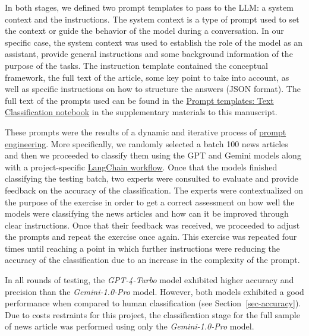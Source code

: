 \documentclass[
]{agujournal2019}
\begin{document}
In both stages, we defined two prompt templates to pass to the LLM: a
system context and the instructions. The system context is a type of
prompt used to set the context or guide the behavior of the model during
a conversation. In our specific case, the system context was used to
establish the role of the model as an assistant, provide general
instructions and some background information of the purpose of the
tasks. The instruction template contained the conceptual framework, the
full text of the article, some key point to take into account, as well
as specific instructions on how to structure the answers (JSON format).
The full text of the prompts used can be found in the
\href{https://ctoruno.github.io/eu-rol-tracker/notebooks/prompts_classification-preview.html}{Prompt
templates: Text Classification notebook} in the supplementary materials
to this manuscript.

These prompts were the results of a dynamic and iterative process of
\href{https://platform.openai.com/docs/guides/prompt-engineering/strategy-write-clear-instructions}{prompt
engineering}. More specifically, we randomly selected a batch 100 news
articles and then we proceeded to classify them using the GPT and Gemini
models along with a project-specific
\href{https://www.langchain.com/}{LangChain workflow}.
Once that the models finished classifying the testing batch, two experts
were consulted to evaluate and provide feedback on the accuracy of the
classification. The experts were contextualized on the purpose of the
exercise in order to get a correct assessment on how well the models
were classifying the news articles and how can it be improved through
clear instructions. Once that their feedback was received, we proceeded
to adjust the prompts and repeat the exercise once again. This exercise
was repeated four times until reaching a point in which further
instructions were reducing the accuracy of the classification due to an
increase in the complexity of the prompt.

In all rounds of testing, the \emph{GPT-4-Turbo} model exhibited higher
accuracy and precision than the \emph{Gemini-1.0-Pro} model. However,
both models exhibited a good performance when compared to human
classification (see Section~\ref{sec-accuracy}). Due to costs restraints
for this project, the classification stage for the full sample of news
article was performed using only the \emph{Gemini-1.0-Pro}
model.
\end{document}
